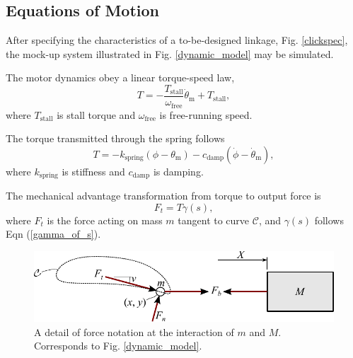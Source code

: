 \documentclass[journal]{IEEEtran}
\begin{document}
\subsection{Equations of Motion}
\label{sec:eq_of_mot}

After specifying the characteristics of a to-be-designed linkage, Fig. \ref{clickspec}, the mock-up system illustrated in Fig. \ref{dynamic_model} may be simulated.

The motor dynamics obey a linear torque-speed law,
\begin{equation}
T = -\frac{T_\text{stall}}{\omega_\text{free}} \dot{\theta}_\text{m} + T_\text{stall},
\label{torque-speed}
\end{equation}
where $T_\text{stall}$ is stall torque and $\omega_\text{free}$ is free-running speed.

The torque transmitted through the spring follows
\begin{equation}
T = -k_\text{spring}(\phi - \theta_\text{m}) - c_\text{damp}(\dot{\phi} - \dot{\theta}_\text{m}),
\end{equation}
where $k_\text{spring}$ is stiffness and $c_\text{damp}$ is damping.

The mechanical advantage transformation from torque to output force is
\begin{equation}
F_t = T \gamma(s),
\end{equation}
where $F_t$ is the force acting on mass $m$ tangent to curve $\mathcal{C}$, and $\gamma(s)$ follows Eqn (\ref{gamma_of_s}).

\begin{figure}[!t]
\centering
\includegraphics[scale=0.65]{dynamic_model_detail}
\caption{A detail of force notation at the interaction of $m$ and $M$.  Corresponds to Fig. \ref{dynamic_model}.}
\label{dynamic_model_detail}
\end{figure}
\end{document}
